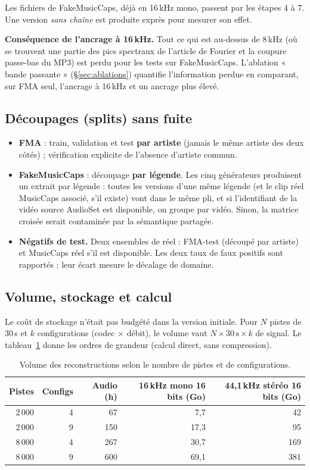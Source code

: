 \documentclass[11pt,a4paper]{article}
\begin{document}
Les fichiers de FakeMusicCaps, déjà en 16\,kHz mono, passent par les étapes 4 à 7. Une version \emph{sans chaîne} est produite exprès pour mesurer son effet.

\textbf{Conséquence de l'ancrage à 16\,kHz.} Tout ce qui est au-dessus de 8\,kHz (où se trouvent une partie des pics spectraux de l'article de Fourier et la coupure passe-bas du MP3) est perdu pour les tests sur FakeMusicCaps. L'ablation « bande passante » (\S\ref{sec:ablations}) quantifie l'information perdue en comparant, sur FMA seul, l'ancrage à 16\,kHz et un ancrage plus élevé.

\subsection{Découpages (splits) sans fuite}

\begin{itemize}
  \item \textbf{FMA} : train, validation et test \textbf{par artiste} (jamais le même artiste des deux côtés) ; vérification explicite de l'absence d'artiste commun.
  \item \textbf{FakeMusicCaps} : découpage \textbf{par légende}. Les cinq générateurs produisent un extrait par légende : toutes les versions d'une même légende (et le clip réel MusicCaps associé, s'il existe) vont dans le même pli, et si l'identifiant de la vidéo source AudioSet est disponible, on groupe par vidéo. Sinon, la matrice croisée serait contaminée par la sémantique partagée.
  \item \textbf{Négatifs de test.} Deux ensembles de réel : FMA-test (découpé par artiste) et MusicCaps réel s'il est disponible. Les deux taux de faux positifs sont rapportés ; leur écart mesure le décalage de domaine.
\end{itemize}

\subsection{Volume, stockage et calcul}
\label{sec:stockage}

Le coût de stockage n'était pas budgété dans la version initiale. Pour $N$ pistes de 30\,s et $k$ configurations (codec $\times$ débit), le volume vaut $N\times 30\,\text{s}\times k$ de signal. Le tableau~\ref{tab:stockage} donne les ordres de grandeur (calcul direct, sans compression).

\begin{table}[h]
\centering
\small
\begin{tabular}{rrrrr}
\toprule
\textbf{Pistes} & \textbf{Configs} & \textbf{Audio (h)} & \textbf{16\,kHz mono 16 bits (Go)} & \textbf{44,1\,kHz stéréo 16 bits (Go)}\\
\midrule
2\,000 & 4 & 67 & 7,7 & 42\\
2\,000 & 9 & 150 & 17,3 & 95\\
8\,000 & 4 & 267 & 30,7 & 169\\
8\,000 & 9 & 600 & 69,1 & 381\\
\bottomrule
\end{tabular}
\caption{Volume des reconstructions selon le nombre de pistes et de configurations.}\label{tab:stockage}
\end{table}
\end{document}
